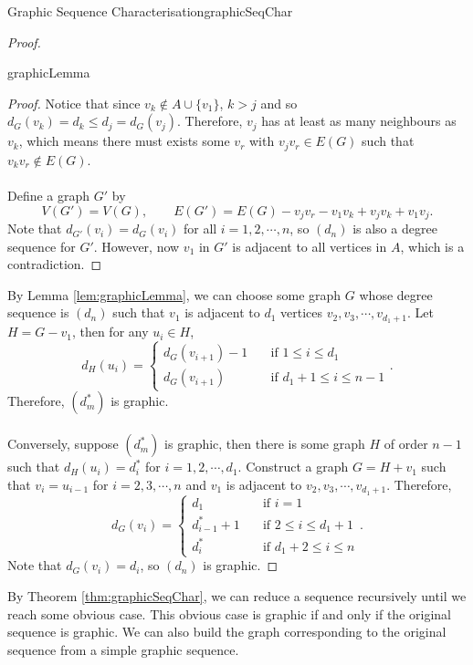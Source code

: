 \documentclass[math]{amznotes}
\theoremstyle{remark}
\begin{document}
\begin{thmbox}{Graphic Sequence Characterisation}{graphicSeqChar}
\begin{proof}
\begin{lembox}{}{graphicLemma}
\begin{proof}
                Notice that since $v_k \notin A \cup \{v_1\}$, $k > j$ and so $d_G(v_k) = d_k \leq d_j = d_G(v_j)$. Therefore, $v_j$ has at least as many neighbours as $v_k$, which means there must exists some $v_r$ with $v_jv_r \in E(G)$ such that $v_kv_r \notin E(G)$.
                \\\\
                Define a graph $G'$ by
                \begin{equation*}
                    V(G') = V(G), \qquad E(G') = E(G) - v_jv_r - v_1v_k + v_jv_k + v_1v_j.
                \end{equation*}
                Note that $d_{G'}(v_i) = d_G(v_i)$ for all $i = 1, 2, \cdots, n$, so $(d_n)$ is also a degree sequence for $G'$. However, now $v_1$ in $G'$ is adjacent to all vertices in $A$, which is a contradiction.
            \end{proof}
        \end{lembox}
        By Lemma \ref{lem:graphicLemma}, we can choose some graph $G$ whose degree sequence is $(d_n)$ such that $v_1$ is adjacent to $d_1$ vertices $v_2, v_3, \cdots, v_{d_1 + 1}$. Let $H = G - v_1$, then for any $u_i \in H$,
        \begin{equation*}
            d_H(u_i) = \begin{cases}
                d_G(v_{i + 1}) - 1 & \quad\textrm{if } 1 \leq i \leq d_1 \\
                d_G(v_{i + 1}) & \quad\textrm{if } d_1 + 1 \leq i \leq n - 1
            \end{cases}.
        \end{equation*}
        Therefore, $\left(d^*_m\right)$ is graphic.
        \\\\
        Conversely, suppose $\left(d^*_m\right)$ is graphic, then there is some graph $H$ of order $n - 1$ such that $d_H(u_i) = d^*_i$ for $i = 1, 2, \cdots, d_1$. Construct a graph $G = H + v_1$ such that $v_i = u_{i - 1}$ for $i = 2, 3, \cdots, n$ and $v_1$ is adjacent to $v_2, v_3, \cdots, v_{d_1 + 1}$. Therefore,
        \begin{equation*}
            d_G(v_i) = \begin{cases}
                d_1 & \quad\textrm{if } i = 1 \\
                d^*_{i - 1} + 1 & \quad\textrm{if } 2 \leq i \leq d_1 + 1 \\
                d^*_{i} & \quad\textrm{if } d_1 + 2 \leq i \leq n
            \end{cases}.
        \end{equation*}
        Note that $d_G(v_i) = d_i$, so $(d_n)$ is graphic.
    \end{proof}
\end{thmbox}
By Theorem \ref{thm:graphicSeqChar}, we can reduce a sequence recursively until we reach some obvious case. This obvious case is graphic if and only if the original sequence is graphic. We can also build the graph corresponding to the original sequence from a simple graphic sequence.
\end{document}

